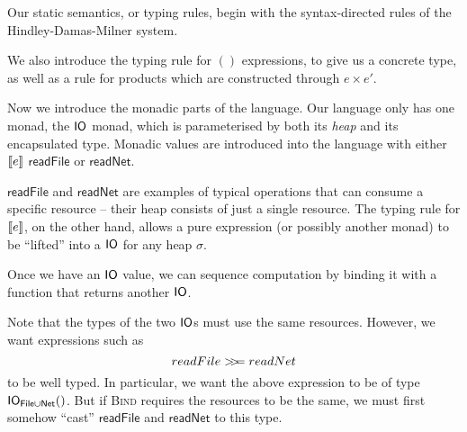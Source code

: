 Our static semantics, or typing rules, begin with the syntax-directed
rules of the Hindley-Damas-Milner system.
We also introduce the typing rule for $()$ expressions, to give us a
concrete type, as well as a rule for products which are constructed
through $e \times e'$.

Now we introduce the monadic parts of the language. Our language only
has one monad, the $\IO$ monad, which is parameterised by both its
\textit{heap} and its encapsulated type. Monadic values are introduced
into the language with either $\lift{e}$
$\textsf{readFile}$ or $\textsf{readNet}$.

$\textsf{readFile}$ and $\textsf{readNet}$ are examples of typical
operations that can consume a specific resource -- their heap consists
of just a single resource. The typing rule for $\lift{e}$, on the
other hand, allows a pure expression (or possibly another monad) to be
``lifted'' into a $\IO$ for any heap $\sigma$.

Once we have an $\IO$ value, we can sequence computation by binding
it with a function that returns another $\IO$.
\begin{mathpar}
\end{mathpar}
Note that the types of the two $\IO$s must use the same
resources. However, we want expressions such as
$$ readFile \bind readNet $$
to be well typed. In particular, we want the above expression to be of
type $\IO_{\textsf{File} \cup \textsf{Net}} ()$. But if \textsc{Bind}
requires the resources to be the same, we must first somehow ``cast''
$\textsf{readFile}$ and $\textsf{readNet}$ to this type.

